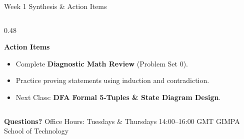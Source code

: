 \documentclass[aspectratio=169, 10pt]{beamer}
\newcommand{\greentitle}[1]{{\noindent\footnotesize\bfseries\color{accentGreen}#1}\par\vspace{0.03cm}}
\begin{document}
\begin{frame}{Week 1 Synthesis \& Action Items}
\begin{columns}[T]
\begin{column}{0.48\textwidth}
\begin{tcolorbox}[examplecard]
        \greentitle{Action Items}
        \begin{itemize}\setlength{\itemsep}{1.5pt}\scriptsize
          \item Complete \textbf{Diagnostic Math Review} (Problem Set 0).
          \item Practice proving statements using induction and contradiction.
          \item Next Class: \textbf{DFA Formal 5-Tuples \& State Diagram Design}.
        \end{itemize}
      \end{tcolorbox}
    \end{column}
  \end{columns}
  
  \vspace{0.08cm}
  \begin{tcolorbox}[spotlightcard]
    \centering
    {\scriptsize\textbf{Questions?} Office Hours: Tuesdays \& Thursdays 14:00--16:00 GMT \;\textbar\; GIMPA School of Technology}
  \end{tcolorbox}
\end{frame}
\end{document}
